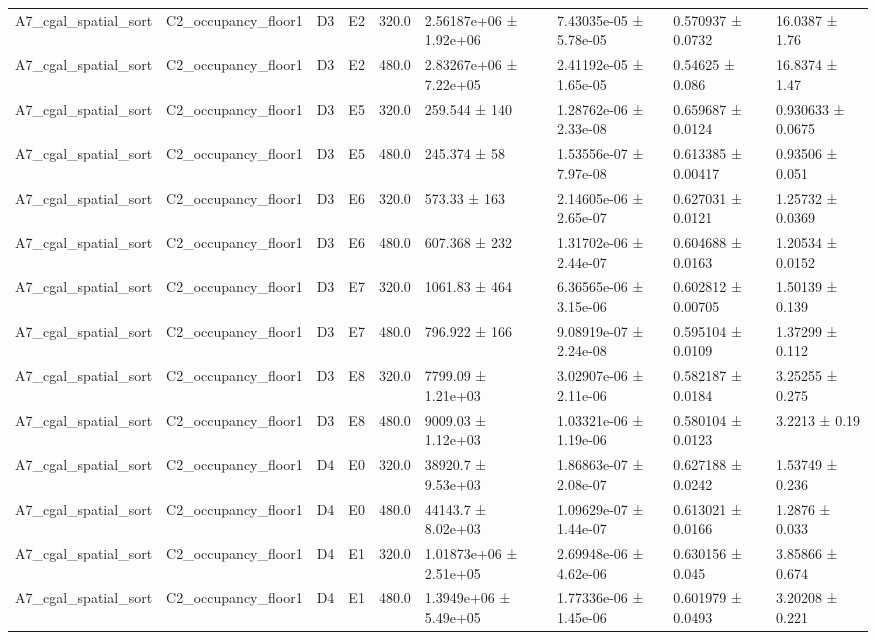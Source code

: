 \begin{table}
\begin{tabular}{lllllllll}
A7\_cgal\_spatial\_sort & C2\_occupancy\_floor1 & D3 & E2 & 320.0 & 2.56187e+06 ± 1.92e+06 & 7.43035e-05 ± 5.78e-05 & 0.570937 ± 0.0732 & 16.0387 ± 1.76 \\
A7\_cgal\_spatial\_sort & C2\_occupancy\_floor1 & D3 & E2 & 480.0 & 2.83267e+06 ± 7.22e+05 & 2.41192e-05 ± 1.65e-05 & 0.54625 ± 0.086 & 16.8374 ± 1.47 \\
A7\_cgal\_spatial\_sort & C2\_occupancy\_floor1 & D3 & E5 & 320.0 & 259.544 ± 140 & 1.28762e-06 ± 2.33e-08 & 0.659687 ± 0.0124 & 0.930633 ± 0.0675 \\
A7\_cgal\_spatial\_sort & C2\_occupancy\_floor1 & D3 & E5 & 480.0 & 245.374 ± 58 & 1.53556e-07 ± 7.97e-08 & 0.613385 ± 0.00417 & 0.93506 ± 0.051 \\
A7\_cgal\_spatial\_sort & C2\_occupancy\_floor1 & D3 & E6 & 320.0 & 573.33 ± 163 & 2.14605e-06 ± 2.65e-07 & 0.627031 ± 0.0121 & 1.25732 ± 0.0369 \\
A7\_cgal\_spatial\_sort & C2\_occupancy\_floor1 & D3 & E6 & 480.0 & 607.368 ± 232 & 1.31702e-06 ± 2.44e-07 & 0.604688 ± 0.0163 & 1.20534 ± 0.0152 \\
A7\_cgal\_spatial\_sort & C2\_occupancy\_floor1 & D3 & E7 & 320.0 & 1061.83 ± 464 & 6.36565e-06 ± 3.15e-06 & 0.602812 ± 0.00705 & 1.50139 ± 0.139 \\
A7\_cgal\_spatial\_sort & C2\_occupancy\_floor1 & D3 & E7 & 480.0 & 796.922 ± 166 & 9.08919e-07 ± 2.24e-08 & 0.595104 ± 0.0109 & 1.37299 ± 0.112 \\
A7\_cgal\_spatial\_sort & C2\_occupancy\_floor1 & D3 & E8 & 320.0 & 7799.09 ± 1.21e+03 & 3.02907e-06 ± 2.11e-06 & 0.582187 ± 0.0184 & 3.25255 ± 0.275 \\
A7\_cgal\_spatial\_sort & C2\_occupancy\_floor1 & D3 & E8 & 480.0 & 9009.03 ± 1.12e+03 & 1.03321e-06 ± 1.19e-06 & 0.580104 ± 0.0123 & 3.2213 ± 0.19 \\
A7\_cgal\_spatial\_sort & C2\_occupancy\_floor1 & D4 & E0 & 320.0 & 38920.7 ± 9.53e+03 & 1.86863e-07 ± 2.08e-07 & 0.627188 ± 0.0242 & 1.53749 ± 0.236 \\
A7\_cgal\_spatial\_sort & C2\_occupancy\_floor1 & D4 & E0 & 480.0 & 44143.7 ± 8.02e+03 & 1.09629e-07 ± 1.44e-07 & 0.613021 ± 0.0166 & 1.2876 ± 0.033 \\
A7\_cgal\_spatial\_sort & C2\_occupancy\_floor1 & D4 & E1 & 320.0 & 1.01873e+06 ± 2.51e+05 & 2.69948e-06 ± 4.62e-06 & 0.630156 ± 0.045 & 3.85866 ± 0.674 \\
A7\_cgal\_spatial\_sort & C2\_occupancy\_floor1 & D4 & E1 & 480.0 & 1.3949e+06 ± 5.49e+05 & 1.77336e-06 ± 1.45e-06 & 0.601979 ± 0.0493 & 3.20208 ± 0.221 \\

\end{tabular}
\end{table}

